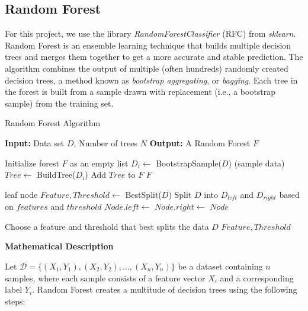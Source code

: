\documentclass[twocolumn]{article}
\begin{document}
\subsection{Random Forest}
\label{4.4}
For this project, we use the library \textit{RandomForestClassifier} (RFC) from \textit{sklearn}.
Random Forest is an ensemble learning technique that builds multiple decision trees and merges them together to get a more accurate and stable prediction. The algorithm combines the output of multiple (often hundreds) randomly created decision trees, a method known as \textit{bootstrap aggregating}, or \textit{bagging}. Each tree in the forest is built from a sample drawn with replacement (i.e., a bootstrap sample) from the training set.

\begin{algorithm}[!h]
\caption{Random Forest Algorithm}
\label{algo4}
\begin{algorithmic}[1]
\State \textbf{Input:} Data set $D$, Number of trees $N$
\State \textbf{Output:} A Random Forest $F$

    \State Initialize forest $F$ as an empty list
        \State $D_i \gets$ BootstrapSample($D$) (sample data)
        \State $Tree \gets$ BuildTree($D_i$)
        \State Add $Tree$ to $F$
    \EndFor
    \State \Return $F$
\EndProcedure

        \State \Return leaf node
    \EndIf
    \State $Feature, Threshold \gets$ BestSplit($D$)
    \State Split $D$ into $D_{left}$ and $D_{right}$ based
    \State on $features$ and $threshold$
    \State $Node.left \gets$ 
    \State $Node.right \gets$ 
    \State \Return $Node$
\EndFunction

    \State Choose a feature and threshold
    \State that best splits the data $D$
    \State \Return $Feature, Threshold$
\EndFunction
\end{algorithmic}
\end{algorithm}

\vspace{10mm}
\textbf{\large Mathematical Description}

Let \( \mathcal{D} = \{(X_1, Y_1), (X_2, Y_2), \dots, (X_n, Y_n)\} \) be a dataset containing \( n \) samples, where each sample consists of a feature vector \( X_i \) and a corresponding label \( Y_i \). Random Forest creates a multitude of decision trees using the following steps:
\end{document}

